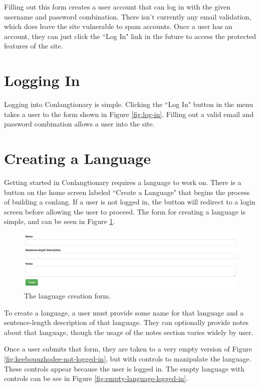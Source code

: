 Filling out this form creates a user account that can log in with the given username and password combination. There isn't currently any email validation, which does leave the site vulnerable to spam accounts. Once a user has an account, they can just click the ``Log In" link in the future to access the protected features of the site.

\section{Logging In}
\label{sec:logging-in}

Logging into Conlangtionary is simple. Clicking the ``Log In" button in the menu takes a user to the form shown in Figure \ref{fig:log-in}. Filling out a valid email and password combination allows a user into the site.

\section{Creating a Language}
\label{sec:creating-language}

Getting started in Conlangtionary requires a language to work on. There is a button on the home screen labeled ``Create a Language" that begins the process of building a conlang. If a user is not logged in, the button will redirect to a login screen before allowing the user to proceed. The form for creating a language is simple, and can be seen in Figure \ref{fig:create-language}.

\begin{figure}[h]
\includegraphics[width=\textwidth]{figures/create-language}
\caption{The language creation form.}
\centering
\label{fig:create-language}
\end{figure}

To create a language, a user must provide some name for that language and a sentence-length description of that language. They can optionally provide notes about that language, though the usage of the notes section varies widely by user.

Once a user submits that form, they are taken to a very empty version of Figure \ref{fig:keebouuzhodee-not-logged-in}, but with controls to manipulate the language. These controls appear because the user is logged in. The empty language with controls can be see in Figure \ref{fig:empty-language-logged-in}.

